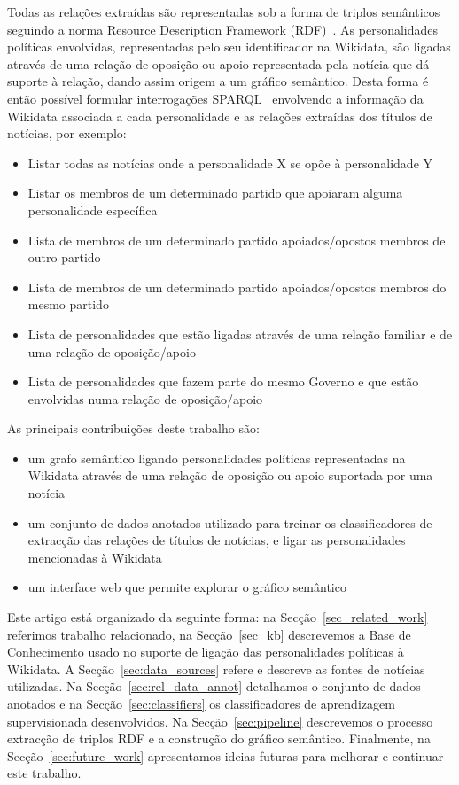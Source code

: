 \documentclass[a4paper, twocolumn, 11pt, twoside]{article}
\begin{document}
Todas as relações extraídas são representadas sob a forma de triplos semânticos seguindo a norma Resource Description Framework (RDF)~\citep{schreiber2014primer}. As personalidades políticas envolvidas, representadas pelo seu identificador na Wikidata, são ligadas através de uma relação de oposição ou apoio representada pela notícia que dá suporte à relação, dando assim origem a um gráfico semântico. Desta forma é então possível formular interrogações SPARQL~\citep{2013sparql} envolvendo a informação da Wikidata associada a cada personalidade e as relações extraídas dos títulos de notícias, por exemplo:

\begin{itemize}
\item{Listar todas as notícias onde a personalidade X se opõe à personalidade Y}
\item{Listar os membros de um determinado partido que apoiaram alguma personalidade específica}
\item{Lista de membros de um determinado partido apoiados/opostos membros de outro partido}
\item{Lista de membros de um determinado partido apoiados/opostos membros do mesmo partido}
\item{Lista de personalidades que estão ligadas através de uma relação familiar e de uma relação de oposição/apoio}
\item{Lista de personalidades que fazem parte do mesmo Governo e que estão envolvidas numa relação de oposição/apoio}
\end{itemize}

As principais contribuições deste trabalho são: 

\begin{itemize}
\item{um grafo semântico ligando personalidades políticas representadas na Wikidata através de uma relação de oposição ou apoio suportada por uma notícia}
\item{um conjunto de dados anotados utilizado para treinar os classificadores de extracção das relações de títulos de notícias, e ligar as personalidades mencionadas à Wikidata}
\item{um interface web que permite explorar o gráfico semântico}
\end{itemize}

Este artigo está organizado da seguinte forma: na Secção~\ref{sec_related_work} referimos trabalho relacionado, na Secção~\ref{sec_kb} descrevemos a Base de Conhecimento usado no suporte de ligação das personalidades políticas à Wikidata. A Secção~\ref{sec:data_sources} refere e descreve as fontes de notícias utilizadas. Na Secção~\ref{sec:rel_data_annot} detalhamos o conjunto de dados anotados e na Secção~\ref{sec:classifiers} os classificadores de aprendizagem supervisionada desenvolvidos. Na Secção~\ref{sec:pipeline} descrevemos o processo extracção de triplos RDF e a construção do gráfico semântico. Finalmente, na Secção~\ref{sec:future_work} apresentamos ideias futuras para melhorar e continuar este trabalho.
\end{document}
